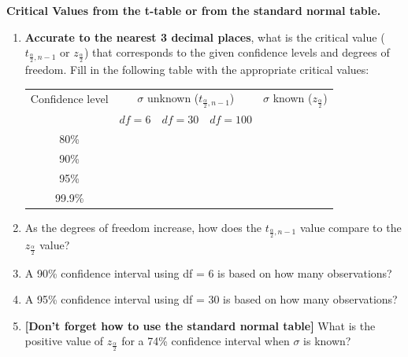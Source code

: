   \item \textbf{Critical Values from the t-table or from the standard normal table.}

 \begin{enumerate} 
 \item \textbf{Accurate to the nearest 3 decimal places}, what is the critical value ($t_{\frac{\alpha}{2},n-1}$ or $z_\frac{\alpha}{2}$) that corresponds to the given confidence levels and degrees of freedom. Fill in the following table with the appropriate critical values:
    \begin{center}
     \begin{tabular}{|c|c|c|c|c|} \hline
      Confidence level & \multicolumn{3}{|c|}{$\sigma$ unknown ($t_{\frac{\alpha}{2},n-1}$)} & $\sigma$ known ($z_\frac{\alpha}{2}$) \\
     & $df=6$ & $df=30$ & $df=100$ & \\
       \hline
       \hline
       80\% &  &  &  &  \\
       \hline
       90\% &  &  &  &  \\
       \hline
       95\% &  &  &  & \\
       \hline
       99.9\% &  &  &  &  \\
       \hline
      \end{tabular}
    \end{center}
    
      \item  As the degrees of freedom increase, how does the $t_{\frac{\alpha}{2},n-1}$ value compare to the $z_\frac{\alpha}{2}$ value?
      \item A 90\% confidence interval using df = 6 is based on how many observations? %
 \item A 95\% confidence interval using df = 30 is based on how many observations? %
 \item \textbf{[Don't forget how to use the standard normal table]} What is the positive value of $z_\frac{\alpha}{2}$ for a 74\% confidence interval when $\sigma$ is known? 
  
  \end{enumerate} 

